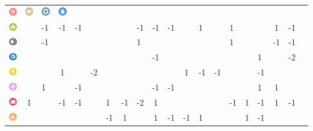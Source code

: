 \begin{table}[h]
\begin{center}
\begin{tabular}{c c g c g c g c g c g c g c g c g c g c}
    \includegraphics[width=1em]{images/psychic.png} &
    \includegraphics[width=1em]{images/rock.png} &
    \includegraphics[width=1em]{images/steel.png} &
    \includegraphics[width=1em]{images/water.png} &
    \\
    \includegraphics[width=1em]{images/bug.png} & & -1 & -1 & -1 & & & & -1 & -1 & -1 & & 1 & & 1 & & & 1 & -1 \\
    \includegraphics[width=1em]{images/dark.png} & & -1 & & & & & & 1 & & & & & & 1 & & & -1 & -1 \\
    \includegraphics[width=1em]{images/dragon.png} & & & & & & & & & -1 & & & & & & & 1 & & -2 \\
    \includegraphics[width=1em]{images/electric.png} & & & 1 & & -2 & & & & & & 1 & -1 & -1 & & & -1 & & \\
    \includegraphics[width=1em]{images/fairy.png} & & 1 & & -1 & & & & & -1 & -1 & & & & & & 1 & 1 & \\
    \includegraphics[width=1em]{images/fighting.png} & 1 & & -1 & -1 & & 1 & -1 & -2 & 1 & & & & & -1 & 1 & -1 & 1 & -1 \\
    \includegraphics[width=1em]{images/fire.png} & & & & & & -1 & 1 & & 1 & -1 & -1 & 1 & & & 1 & -1 & & \\

\end{tabular}
\end{center}
\end{table}
